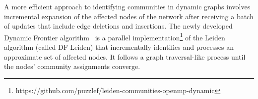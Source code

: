 

A more efficient approach to identifying communities in dynamic graphs involves incremental expansion of the affected nodes of the network after receiving a batch of updates that include edge deletions and insertions. The newly developed Dynamic Frontier algorithm~\cite{SLe24} is a parallel implementation\footnote{https://github.com/puzzlef/leiden-communities-openmp-dynamic} of the Leiden algorithm (called DF-Leiden) that incrementally identifies and processes an approximate set of affected nodes. It follows a graph traversal-like process until the nodes' community assignments converge.


